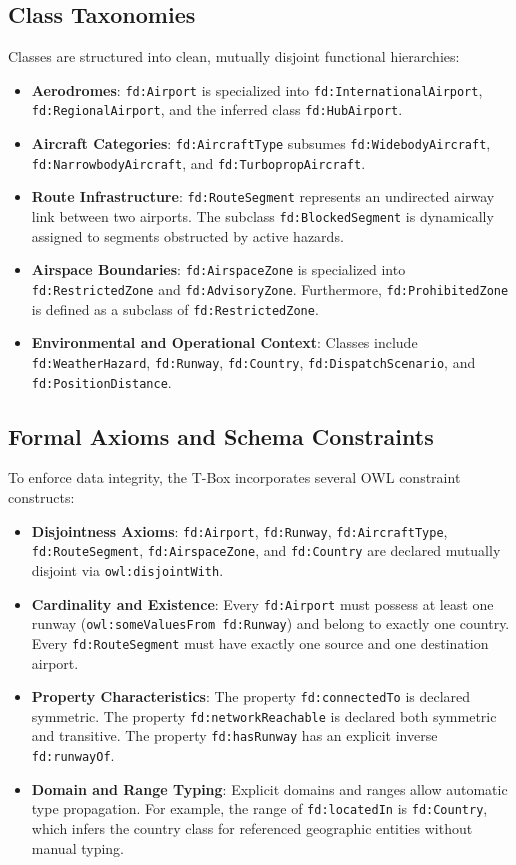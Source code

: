 \documentclass[conference]{IEEEtran}
\begin{document}
\subsection{Class Taxonomies}
Classes are structured into clean, mutually disjoint functional hierarchies:
\begin{itemize}
    \item \textbf{Aerodromes}: \texttt{fd:Airport} is specialized into \texttt{fd:InternationalAirport}, \texttt{fd:RegionalAirport}, and the inferred class \texttt{fd:HubAirport}.
    \item \textbf{Aircraft Categories}: \texttt{fd:AircraftType} subsumes \texttt{fd:WidebodyAircraft}, \texttt{fd:NarrowbodyAircraft}, and \texttt{fd:TurbopropAircraft}.
    \item \textbf{Route Infrastructure}: \texttt{fd:RouteSegment} represents an undirected airway link between two airports. The subclass \texttt{fd:BlockedSegment} is dynamically assigned to segments obstructed by active hazards.
    \item \textbf{Airspace Boundaries}: \texttt{fd:AirspaceZone} is specialized into \texttt{fd:RestrictedZone} and \texttt{fd:AdvisoryZone}. Furthermore, \texttt{fd:ProhibitedZone} is defined as a subclass of \texttt{fd:RestrictedZone}.
    \item \textbf{Environmental and Operational Context}: Classes include \texttt{fd:WeatherHazard}, \texttt{fd:Runway}, \texttt{fd:Country}, \texttt{fd:DispatchScenario}, and \texttt{fd:PositionDistance}.
\end{itemize}

\subsection{Formal Axioms and Schema Constraints}
To enforce data integrity, the T-Box incorporates several OWL constraint constructs:
\begin{itemize}
    \item \textbf{Disjointness Axioms}: \texttt{fd:Airport}, \texttt{fd:Runway}, \texttt{fd:AircraftType}, \texttt{fd:RouteSegment}, \texttt{fd:AirspaceZone}, and \texttt{fd:Country} are declared mutually disjoint via \texttt{owl:disjointWith}.
    \item \textbf{Cardinality and Existence}: Every \texttt{fd:Airport} must possess at least one runway (\texttt{owl:someValuesFrom fd:Runway}) and belong to exactly one country. Every \texttt{fd:RouteSegment} must have exactly one source and one destination airport.
    \item \textbf{Property Characteristics}: The property \texttt{fd:connectedTo} is declared symmetric. The property \texttt{fd:networkReachable} is declared both symmetric and transitive. The property \texttt{fd:hasRunway} has an explicit inverse \texttt{fd:runwayOf}.
    \item \textbf{Domain and Range Typing}: Explicit domains and ranges allow automatic type propagation. For example, the range of \texttt{fd:locatedIn} is \texttt{fd:Country}, which infers the country class for referenced geographic entities without manual typing.
\end{itemize}
\end{document}
